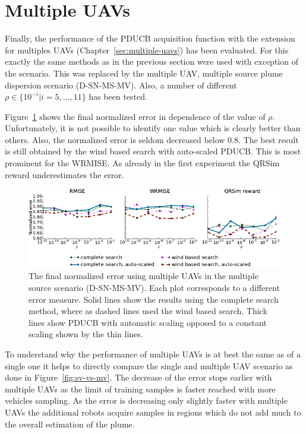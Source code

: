 \section{Multiple UAVs}
Finally, the performance of the PDUCB acquisition function with the extension 
for multiples UAVs (Chapter~\ref{sec:multiple-uavs}) has been evaluated. For 
this exactly the same methods as in the previous section were used with 
exception of the scenario. This was replaced by the multiple UAV, multiple 
source plume dispersion scenario (D-SN-MS-MV). Also, a number of different $\rho 
\in \{10^{-i} | i = 5, \dots, 11\}$ has been tested.

Figure~\ref{fig:mv-err} shows the final normalized error in dependence of the 
value of $\rho$. Unfortunately, it is not possible to identify one value which 
is clearly better than others. Also, the normalized error is seldom decreased 
below \num{0.8}. The best result is still obtained by the wind based search with 
auto-scaled PDUCB\@. This is most prominent for the WRMISE\@. As already in the 
first experiment the QRSim reward underestimates the error.

\begin{figure}
    \centering
    \includegraphics{plots/multiple-uav}
    \caption[Normalized error using multiple UAVs in dependence of $\rho$]{The 
        final normalized error using multiple UAVs in the multiple source 
        scenario (D-SN-MS-MV).  Each plot corresponds to a different error 
        measure. Solid lines show the results using the complete search method, 
        where as dashed lines used the wind based search.  Thick lines show 
        PDUCB with automatic scaling opposed to a constant scaling shown by the 
        thin lines.}\label{fig:mv-err}
\end{figure}

To understand why the performance of multiple UAVs is at best the same as of 
a single one it helps to directly compare the single and multiple UAV scenario 
as done in Figure~\ref{fig:sv-vs-mv}.  The decrease of the error stops earlier 
with multiple UAVs as the limit of training samples is faster reached with more 
vehicles sampling.  As the error is decreasing only slightly faster with 
multiple UAVs the additional robots acquire samples in regions which do not add 
much to the overall estimation of the plume.

